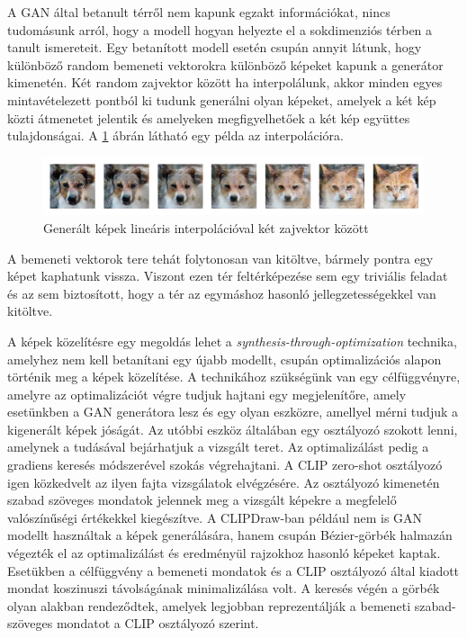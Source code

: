 
A GAN által betanult térről nem kapunk egzakt információkat, nincs tudomásunk arról, hogy a modell hogyan helyezte el a sokdimenziós térben a tanult ismereteit. Egy betanított modell esetén csupán annyit látunk, hogy különböző random bemeneti vektorokra különböző képeket kapunk a generátor kimenetén.
Két random zajvektor között ha interpolálunk, akkor minden egyes mintavételezett pontból ki tudunk generálni olyan képeket, amelyek a két kép közti átmenetet jelentik és amelyeken megfigyelhetőek a két kép együttes tulajdonságai. A \ref{fig:interpolation} ábrán látható egy példa az interpolációra.

\begin{figure}[h]
\centering
\includegraphics[width=15cm]{images/interpolation.png}
\caption{Generált képek lineáris interpolációval két zajvektor között}
\label{fig:interpolation}
\end{figure}

A bemeneti vektorok tere tehát folytonosan van kitöltve, bármely pontra egy képet kaphatunk vissza. Viszont ezen tér feltérképezése sem egy triviális feladat és az sem biztosított, hogy a tér az egymáshoz hasonló jellegzetességekkel van kitöltve.

A képek közelítésre egy megoldás lehet a \textit{synthesis-through-optimization}\cite{frans2021clipdraw} technika, amelyhez nem kell betanítani egy újabb modellt, csupán optimalizációs alapon történik meg a képek közelítése.
A technikához szükségünk van egy célfüggvényre, amelyre az optimalizációt végre tudjuk hajtani egy megjelenítőre, amely esetünkben a GAN generátora lesz és egy olyan eszközre, amellyel mérni tudjuk a kigenerált képek jóságát. Az utóbbi eszköz általában egy osztályozó szokott lenni, amelynek a tudásával bejárhatjuk a vizsgált teret. Az optimalizálást pedig a gradiens keresés módszerével szokás végrehajtani.
A CLIP \cite{radford2021learning} zero-shot osztályozó igen közkedvelt az ilyen fajta vizsgálatok elvégzésére. Az osztályozó kimenetén szabad szöveges mondatok jelennek meg a vizsgált képekre a megfelelő valószínűségi értékekkel kiegészítve. A CLIPDraw-ban \cite{frans2021clipdraw}  például nem is GAN modellt használtak a képek generálására, hanem csupán Bézier-görbék halmazán végezték el az optimalizálást és eredményül rajzokhoz hasonló képeket kaptak. Esetükben a célfüggvény a bemeneti mondatok és a CLIP osztályozó által kiadott mondat koszinuszi távolságának minimalizálása volt. A keresés végén a görbék olyan alakban rendeződtek, amelyek legjobban reprezentálják a bemeneti szabad-szöveges mondatot a CLIP osztályozó szerint.

